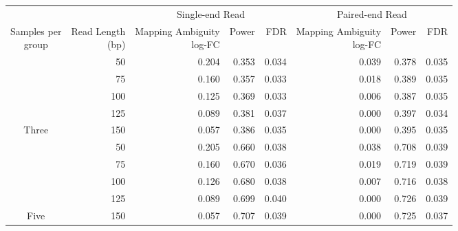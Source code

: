 
\begin{tabular}[t]{crrrrrrr}
\toprule
\multicolumn{2}{c}{ } & \multicolumn{3}{c}{Single-end Read} & \multicolumn{3}{c}{Paired-end Read} \\
\cmidrule(l{3pt}r{3pt}){3-5} \cmidrule(l{3pt}r{3pt}){6-8}
\makecell[c]{Samples per\\group} & \makecell[c]{Read Length\\(bp)} & \makecell[c]{Mapping Ambiguity\\log-FC} & Power & FDR & \makecell[c]{Mapping Ambiguity\\log-FC} & Power & FDR\\
\midrule
 & 50 & 0.204 & 0.353 & 0.034 & 0.039 & 0.378 & 0.035\\

 & 75 & 0.160 & 0.357 & 0.033 & 0.018 & 0.389 & 0.035\\

 & 100 & 0.125 & 0.369 & 0.033 & 0.006 & 0.387 & 0.035\\

 & 125 & 0.089 & 0.381 & 0.037 & 0.000 & 0.397 & 0.034\\

\multirow{-5}{*}{\centering\arraybackslash Three} & 150 & 0.057 & 0.386 & 0.035 & 0.000 & 0.395 & 0.035\\
\cmidrule{1-8}
 & 50 & 0.205 & 0.660 & 0.038 & 0.038 & 0.708 & 0.039\\

 & 75 & 0.160 & 0.670 & 0.036 & 0.019 & 0.719 & 0.039\\

 & 100 & 0.126 & 0.680 & 0.038 & 0.007 & 0.716 & 0.038\\

 & 125 & 0.089 & 0.699 & 0.040 & 0.000 & 0.726 & 0.039\\

\multirow{-5}{*}{\centering\arraybackslash Five} & 150 & 0.057 & 0.707 & 0.039 & 0.000 & 0.725 & 0.037\\
\bottomrule
\end{tabular}
